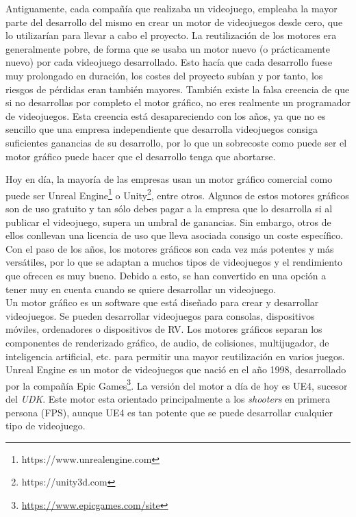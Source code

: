 Antiguamente, cada compañía que realizaba un videojuego, empleaba la mayor parte del desarrollo del mismo en crear un motor de videojuegos desde cero, que lo utilizarían para llevar a cabo el proyecto. La reutilización de los motores era generalmente pobre, de forma que se usaba un motor nuevo (o prácticamente nuevo) por cada videojuego desarrollado. Esto hacía que cada desarrollo fuese muy prolongado en duración, los costes del proyecto subían y por tanto, los riesgos de pérdidas eran también mayores. También existe la falsa creencia de que si no desarrollas por completo el motor gráfico, no eres realmente un programador de videojuegos. Esta creencia está desapareciendo con los años, ya que no es sencillo que una empresa independiente que desarrolla videojuegos consiga suficientes ganancias de su desarrollo, por lo que un sobrecoste como puede ser el motor gráfico puede hacer que el desarrollo tenga que abortarse.\\

\pagestyle{notsection}

Hoy en día, la mayoría de las empresas usan un motor gráfico comercial como puede ser Unreal Engine\footnote{https://www.unrealengine.com} o Unity\footnote{https://unity3d.com}, entre otros. Algunos de estos motores gráficos son de uso gratuito y tan sólo debes pagar a la empresa que lo desarrolla si al publicar el videojuego, supera un umbral de ganancias. Sin embargo, otros de ellos conllevan una licencia de uso que lleva asociada consigo un coste específico. Con el paso de los años, los motores gráficos son cada vez más potentes y más versátiles, por lo que se adaptan a muchos tipos de videojuegos y el rendimiento que ofrecen es muy bueno. Debido a esto, se han convertido en una opción a tener muy en cuenta cuando se quiere desarrollar un videojuego. \\


Un motor gráfico \cite{5} es un software que está diseñado para crear y desarrollar videojuegos. Se pueden desarrollar videojuegos para consolas, dispositivos móviles, ordenadores o dispositivos de \acf{RV}. Los motores gráficos separan los componentes de renderizado gráfico, de audio, de colisiones, multijugador, de inteligencia artificial, etc. para permitir una mayor reutilización en varios juegos.\\


Unreal Engine es un motor de videojuegos que nació en el año 1998, desarrollado por la compañía Epic Games\footnote{\url{https://www.epicgames.com/site}}. La versión del motor a día de hoy es \acf{UE4}, sucesor del \textit{\acf{UDK}}. Este motor esta orientado principalmente a los \textit{shooters} en primera persona (\acf{FPS}), aunque \acs{UE4} es tan potente que se puede desarrollar cualquier tipo de videojuego.


